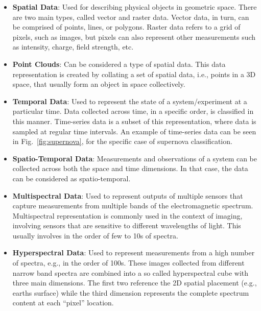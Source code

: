     \begin{itemize}
        \item \textbf{Spatial Data}: Used for describing physical objects in geometric space. There are two main types, called vector and raster data. Vector data, in turn, can be comprised of points, lines, or polygons. Raster data refers to a grid of pixels, such as images, but pixels can also represent other measurements such as intensity, charge, field strength, etc.
        \item \textbf{Point Clouds}: Can be considered a type of spatial data. This data representation is created by collating a set of spatial data, i.e., points in a 3D space, that usually form an object in space collectively. 
        \item \textbf{Temporal Data}: Used to represent the state of a system/experiment at a particular time. Data collected across time, in a specific order, is classified in this manner. Time-series data is a subset of this representation, where data is sampled at regular time intervals. An example of time-series data can be seen in Fig.~\ref{fig:supernova}, for the specific case of supernova classification.
        \item \textbf{Spatio-Temporal Data}: Measurements and observations of a system can be collected across both the space and time dimensions. In that case, the data can be considered as spatio-temporal. 
        \item \textbf{Multispectral Data}: Used to represent outputs of multiple sensors that capture measurements from multiple bands of the electromagnetic spectrum. Multispectral representation is commonly used in the context of imaging, involving sensors that are sensitive to different wavelengths of light. This usually involves in the order of few to 10s of spectra.    
        \item \textbf{Hyperspectral Data}: Used to represent measurements from a high number of spectra, e.g., in the order of 100s. These images collected from different narrow band spectra are combined into a so called hyperspectral cube with three main dimensions. The first two reference the 2D spatial placement (e.g., earths surface) while the third dimension represents the complete spectrum content at each ``pixel'' location.  
    \end{itemize}  

